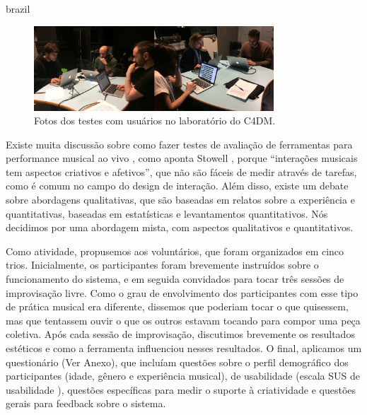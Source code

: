 \begin{otherlanguage*}{brazil}
\begin{figure}
\centering
\includegraphics[width=0.8\textwidth]{pictures/cap4/usertest}
\caption{\label{usertest}Fotos dos testes com usuários no laboratório do C4DM.}
\label{fig:SUS}
\end{figure}


Existe muita discussão sobre como fazer testes de avaliação de ferramentas para performance musical ao vivo \cite{Barbosa2015}, como aponta Stowell \cite{Stowell}, porque ``interações musicais tem aspectos criativos e afetivos'', que não são fáceis de medir através de tarefas, como é comum no campo do design de interação. Além disso, existe um debate sobre abordagens qualitativas, que são baseadas em relatos sobre a experiência e quantitativas, baseadas em estatísticas e levantamentos quantitativos. Nós decidimos por uma abordagem mista, com aspectos qualitativos e quantitativos.

Como atividade, propusemos aos voluntários, que foram organizados em cinco trios. Inicialmente, os participantes foram brevemente instruídos sobre o funcionamento do sistema, e em seguida convidados para tocar três sessões de improvisação livre. Como o grau de envolvimento dos participantes com esse tipo de prática musical era diferente, dissemos que poderiam tocar o que quisessem, mas que tentassem ouvir o que os outros estavam tocando para compor uma peça coletiva. Após cada sessão de improvisação, discutimos brevemente os resultados estéticos e como a ferramenta influenciou nesses resultados. O final, aplicamos um questionário (Ver Anexo), que incluíam questões sobre o perfil demográfico dos participantes (idade, gênero e experiência musical), de usabilidade (escala SUS de usabilidade \cite{Jordan1996}), questões específicas para medir o suporte à criatividade \cite{Cherry2014} e questões gerais para feedback sobre o sistema. 


\end{otherlanguage*}
